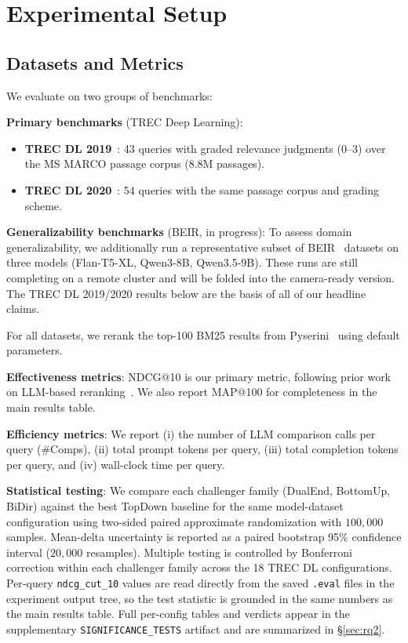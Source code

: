 \section{Experimental Setup}
\label{sec:experiments}

\subsection{Datasets and Metrics}

We evaluate on two groups of benchmarks:

\textbf{Primary benchmarks} (TREC Deep Learning):
\begin{itemize}[leftmargin=*]
\item \textbf{TREC DL 2019}~\citep{craswell2020overview}: 43 queries with graded relevance judgments (0--3) over the MS MARCO passage corpus (8.8M passages).
\item \textbf{TREC DL 2020}~\citep{craswell2021overview}: 54 queries with the same passage corpus and grading scheme.
\end{itemize}

\textbf{Generalizability benchmarks} (BEIR, in progress): To assess domain generalizability, we additionally run a representative subset of BEIR~\citep{thakur2021beir} datasets on three models (Flan-T5-XL, Qwen3-8B, Qwen3.5-9B). These runs are still completing on a remote cluster and will be folded into the camera-ready version. The TREC DL 2019/2020 results below are the basis of all of our headline claims.

For all datasets, we rerank the top-100 BM25 results from Pyserini~\citep{lin2021pyserini} using default parameters.

\textbf{Effectiveness metrics}: NDCG@10 is our primary metric, following prior work on LLM-based reranking~\citep{zhuang2024setwise, sun2023chatgpt, qin2024large}. We also report MAP@100 for completeness in the main results table.

\textbf{Efficiency metrics}: We report (i) the number of LLM comparison calls per query (\#Comps), (ii) total prompt tokens per query, (iii) total completion tokens per query, and (iv) wall-clock time per query.

\textbf{Statistical testing}: We compare each challenger family (DualEnd, BottomUp, BiDir) against the best TopDown baseline for the same model-dataset configuration using two-sided paired approximate randomization with $100{,}000$ samples. Mean-delta uncertainty is reported as a paired bootstrap 95\% confidence interval ($20{,}000$ resamples). Multiple testing is controlled by Bonferroni correction within each challenger family across the 18 TREC DL configurations. Per-query \texttt{ndcg\_cut\_10} values are read directly from the saved \texttt{.eval} files in the experiment output tree, so the test statistic is grounded in the same numbers as the main results table. Full per-config tables and verdicts appear in the supplementary \texttt{SIGNIFICANCE\_TESTS} artifact and are summarized in \S\ref{sec:rq2}.

